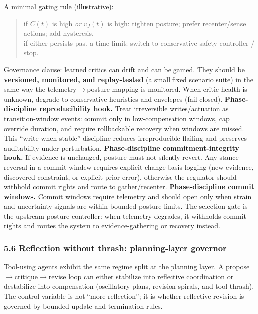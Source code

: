 \documentclass[11pt]{article}
\begin{document}
A minimal gating rule (illustrative):

\begin{quote}
if \(\bar C(t)\) is high \emph{or} \(\bar u_{J}(t)\) is high: tighten posture; prefer recenter/sense actions; add hysteresis.\\
if either persists past a time limit: switch to conservative safety controller / stop.
\end{quote}

Governance clause: learned critics can drift and can be gamed. They should be \textbf{versioned, monitored, and replay-tested} (a small fixed scenario suite) in the same way the telemetry\(\rightarrow\)posture mapping is monitored. When critic health is unknown, degrade to conservative heuristics and envelopes (fail closed).
\noindent\textbf{Phase-discipline reproducibility hook.} Treat irreversible writes/actuation as transition-window events: commit only in low-compensation windows, cap override duration, and require rollbackable recovery when windows are missed. This ``write when stable'' discipline reduces irreproducible flailing and preserves auditability under perturbation.
\noindent\textbf{Phase-discipline commitment-integrity hook.} If evidence is unchanged, posture must not silently revert. Any stance reversal in a commit window requires explicit change-basis logging (new evidence, discovered constraint, or explicit prior error), otherwise the regulator should withhold commit rights and route to gather/recenter.
\noindent\textbf{Phase-discipline commit windows.} Commit windows require telemetry and should open only when strain and uncertainty signals are within bounded posture limits. The selection gate is the upstream posture controller: when telemetry degrades, it withholds commit rights and routes the system to evidence-gathering or recovery instead.

\hypertarget{reflection-without-thrash-governor}{%
\subsubsection{5.6 Reflection without thrash: planning-layer governor}\label{reflection-without-thrash-governor}}

Tool-using agents exhibit the same regime split at the planning layer. A propose\(\rightarrow\)critique\(\rightarrow\)revise loop can either stabilize into reflective coordination or destabilize into compensation (oscillatory plans, revision spirals, and tool thrash). The control variable is not ``more reflection''; it is whether reflective revision is governed by bounded update and termination rules.
\end{document}
